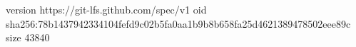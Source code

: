 version https://git-lfs.github.com/spec/v1
oid sha256:78b1437942334104fefd9c02b5fa0aa1b9b8b658fa25d4621389478502eee89c
size 43840
